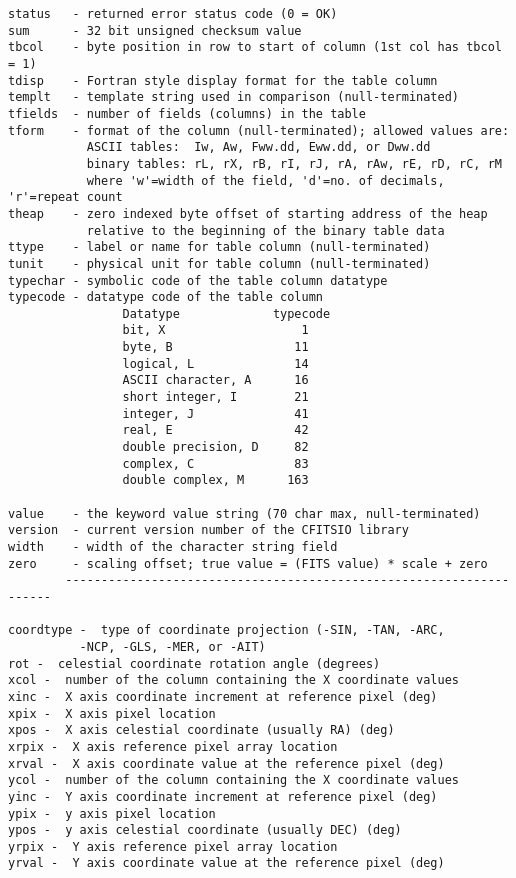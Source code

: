 \begin{verbatim}
status   - returned error status code (0 = OK)
sum      - 32 bit unsigned checksum value
tbcol    - byte position in row to start of column (1st col has tbcol = 1)
tdisp    - Fortran style display format for the table column
templt   - template string used in comparison (null-terminated)
tfields  - number of fields (columns) in the table
tform    - format of the column (null-terminated); allowed values are:
           ASCII tables:  Iw, Aw, Fww.dd, Eww.dd, or Dww.dd
           binary tables: rL, rX, rB, rI, rJ, rA, rAw, rE, rD, rC, rM
           where 'w'=width of the field, 'd'=no. of decimals, 'r'=repeat count
theap    - zero indexed byte offset of starting address of the heap
           relative to the beginning of the binary table data
ttype    - label or name for table column (null-terminated)
tunit    - physical unit for table column (null-terminated)
typechar - symbolic code of the table column datatype
typecode - datatype code of the table column
                Datatype             typecode
                bit, X                   1
                byte, B                 11
                logical, L              14
                ASCII character, A      16
                short integer, I        21
                integer, J              41
                real, E                 42
                double precision, D     82
                complex, C              83
                double complex, M      163

value    - the keyword value string (70 char max, null-terminated)
version  - current version number of the CFITSIO library
width    - width of the character string field
zero     - scaling offset; true value = (FITS value) * scale + zero
        --------------------------------------------------------------------

coordtype -  type of coordinate projection (-SIN, -TAN, -ARC,
          -NCP, -GLS, -MER, or -AIT)
rot -  celestial coordinate rotation angle (degrees)
xcol -  number of the column containing the X coordinate values
xinc -  X axis coordinate increment at reference pixel (deg)
xpix -  X axis pixel location
xpos -  X axis celestial coordinate (usually RA) (deg)
xrpix -  X axis reference pixel array location
xrval -  X axis coordinate value at the reference pixel (deg)
ycol -  number of the column containing the X coordinate values
yinc -  Y axis coordinate increment at reference pixel (deg)
ypix -  y axis pixel location
ypos -  y axis celestial coordinate (usually DEC) (deg)
yrpix -  Y axis reference pixel array location
yrval -  Y axis coordinate value at the reference pixel (deg)
\end{verbatim}

